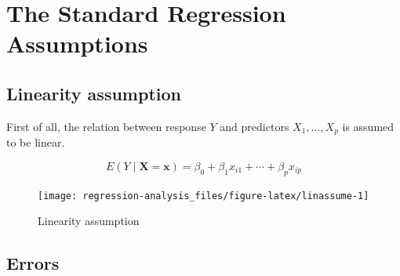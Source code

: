 \documentclass[]{book}
\newenvironment{Shaded}{\begin{snugshade}}{\end{snugshade}}
\newcommand{\DataTypeTok}[1]{\textcolor[rgb]{0.13,0.29,0.53}{#1}}
\newcommand{\DecValTok}[1]{\textcolor[rgb]{0.00,0.00,0.81}{#1}}
\newcommand{\KeywordTok}[1]{\textcolor[rgb]{0.13,0.29,0.53}{\textbf{#1}}}
\newcommand{\NormalTok}[1]{#1}
\newcommand{\OperatorTok}[1]{\textcolor[rgb]{0.81,0.36,0.00}{\textbf{#1}}}
\newcommand{\StringTok}[1]{\textcolor[rgb]{0.31,0.60,0.02}{#1}}
\theoremstyle{definition}
\theoremstyle{definition}
\theoremstyle{definition}
\theoremstyle{remark}
\begin{document}
\hypertarget{the-standard-regression-assumptions}{%
\section{The Standard Regression Assumptions}\label{the-standard-regression-assumptions}}

\hypertarget{linassumption}{%
\subsection{Linearity assumption}\label{linassumption}}

First of all, the relation between response \(Y\) and predictors \(X_1, \ldots, X_p\) is assumed to be linear.

\[E(Y \mid \mathbf{X} = \mathbf{x}) = \beta_0 + \beta_1 x_{i1} + \cdots + \beta_p x_{ip}\]

\begin{Shaded}
\end{Shaded}

\begin{figure}[H]

{\centering \texttt{[image: regression-analysis\_files/figure-latex/linassume-1]} 

}

\caption{Linearity assumption}\label{fig:linassume}
\end{figure}

\hypertarget{errassumption}{%
\subsection{Errors}\label{errassumption}}
\end{document}
